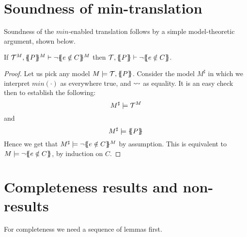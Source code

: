\documentclass[preprint]{sigplanconf}
\begin{document}
\section{Soundness of min-translation}

Soundness of the $min$-enabled translation follows by a simple
model-theoretic argument, shown below.

\begin{theorem}[Soundness]
If $\Th^M,\ptrans{}{P}^M \vdash \neg \ctrans{}{}{e \notin C}^M$ then
   $\Th , \ptrans{}{P} \vdash \neg \ctrans{}{}{e \notin C}$.
\end{theorem}
\begin{proof}
Let us pick any model $M \models {\cal T},\{\!\!\{P\}\!\!\}$. Consider the model 
$M^{\sharp}$ in which we interpret $min(\cdot)$ as everywhere true, and 
$\rightsquigarrow$ as equality. It is an easy check then to establish the following:
\[   M^{\sharp} \models {\cal T}^M \] 
and
\[   M^{\sharp} \models \{\!\!\{P\}\!\!\} \]
Hence we get that $M^{\sharp} \models \neg \{\!\!\{e \notin C\}\!\!\}^M$ 
by assumption. This is equivalent to $M \models \neg \{\!\!\{e \notin C\}\!\!\}$,
by induction on $C$.
\end{proof}

\section{Completeness results and non-results}

For completeness we need a sequence of lemmas first.
\end{document}
